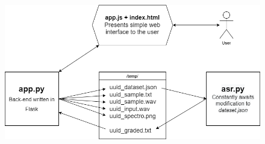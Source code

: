 \documentclass[12pt, letterpaper]{article}
\begin{document}
\begin{figure}[h!]
  \includegraphics[scale=0.6]{images/workflow.png}
\end{figure}
\end{document}
